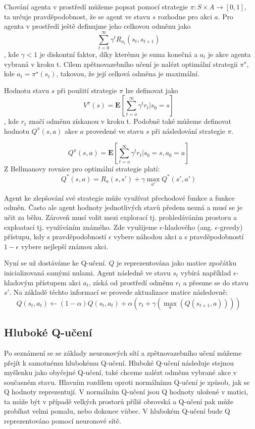 Chování agenta v prostředí můžeme popsat pomocí strategie $\pi: S \times A \rightarrow [0,1]$, ta určuje pravděpodobnost, že se agent ve stavu $s$ rozhodne pro akci $a$.
Pro agenta v prostředí ještě definujme jeho celkovou odměnu jako \[\sum_{t=0}^{\infty} \gamma^tR_{a_t}(s_t,s_{t+1})\], kde $\gamma<1$ je diskontní faktor, díky kterému je suma konečná a $a_t$ je akce agenta vybraná v kroku t.
Cílem zpětnovazebního učení je nalézt optimální strategii $\pi^\star$, kde $a_t=\pi^\star(s_t)$, takovou, že její celková odměna je maximální.

Hodnotu stavu $s$ při použití strategie $\pi$ lze definovat jako 
\newline
\[V^{\pi}(s)=\mathbf{E}[\sum_{t=o}^{\infty} \gamma^tr_t|s_0=s]\], kde $r_t$ značí odměnu získanou v kroku t.
Podobně také můžeme definovat hodnotu $Q^{\pi}(s,a)$ akce $a$ provedené ve stavu $s$ při následování strategie $\pi$.

\[Q^{\pi}(s,a)=\mathbf{E}[\sum_{t=o}^{\infty} \gamma^tr_t|s_0=s, a_0=a]\]
Z Bellmanovy rovnice pro optimální strategie platí:
\[Q^*(s,a)=R_a(s,s') + \gamma\max_{a'}Q^*(s',a')\]

Agent ke zlepšování své strategie může využívat přechodové funkce a funkce odměn. Často ale agent hodnoty jednotlivých stavů předem nezná a musí se je učit za běhu.
Zároveň musí volit mezi explorací tj. prohledáváním prostoru a exploatací tj. využíváním známého. Zde využijeme $\epsilon$-hladového (ang. $\epsilon$-greedy) přístupu, kdy s pravděpodobností $\epsilon$ vybere náhodou akci a s pravděpodobností $1-\epsilon$ vybere nejlepší známou akci.

Nyní se už dostáváme ke Q-učení. $Q$ je reprezentována jako matice zpočátku inicializovaná samými nulami. Agent následně ve stavu $s_t$ vybírá například $\epsilon$-hladovým přístupem akci $a_t$, získá od prostředí odměnu $r_t$ a přesune se do stavu $s'$.
Na základě těchto informací se provede aktualizace matice následovně:
\newline
\[Q(s_t,a_t) \leftarrow (1-\alpha)Q(s_t,a_t) + \alpha(r_t + \gamma(\max_a(Q(s_{t+1},a))))\]




\subsection{Hluboké Q-učení}
Po seznámení se se základy neuronových sítí a zpětnovazebního učení můžeme přejít k samotnému hlubokému Q-učení.
Hluboké Q-učení následuje stejnou myšlenku jako obyčejné Q-učení, také chceme nalézt odměnu vybrané akce v současném stavu.
Hlavním rozdílem oproti normálnímu Q-učení je způsob, jak se Q hodnoty reprezentují. V normálním Q-učení jsou Q hodnoty uložené v matici, ta může být v případě velkých prostorů příliš obrovská a Q-učení pak může probíhat velmi pomalu, nebo dokonce vůbec.
V hlubokém Q-učení bude Q reprezentováno pomocí neuronové sítě.

